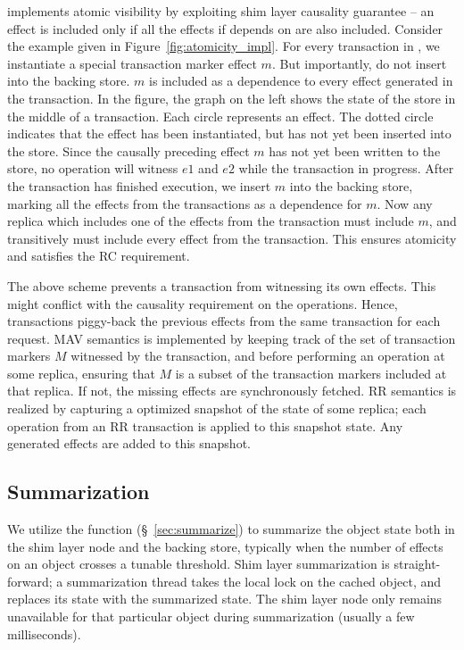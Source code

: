 \name implements atomic visibility by exploiting shim layer causality guarantee
-- an effect is included only if all the effects if depends on are also
included. Consider the example given in Figure~\ref{fig:atomicity_impl}. For
every transaction in \name, we instantiate a special transaction marker
effect $m$. But importantly, do not insert into the backing store. $m$ is
included as a dependence to every effect generated in the transaction. In the
figure, the graph on the left shows the state of the store in the middle of a
transaction. Each circle represents an effect. The dotted circle indicates that
the effect has been instantiated, but has not yet been inserted into the store.
Since the causally preceding effect $m$ has not yet been written to the store,
no operation will witness $e1$ and $e2$ while the transaction in progress.
After the transaction has finished execution, we insert $m$ into the backing
store, marking all the effects from the transactions as a dependence for $m$.
Now any replica which includes one of the effects from the transaction must
include $m$, and transitively must include every effect from the transaction.
This ensures atomicity and satisfies the RC requirement.

The above scheme prevents a transaction from witnessing its own effects. This
might conflict with the causality requirement on the operations. Hence,
transactions piggy-back the previous effects from the same transaction for each
request. MAV semantics is implemented by keeping track of the set of
transaction markers $M$ witnessed by the transaction, and before performing an
operation at some replica, ensuring that $M$ is a subset of the transaction
markers included at that replica. If not, the missing effects are synchronously
fetched. RR semantics is realized by capturing a optimized snapshot of the
state of some replica; each operation from an RR transaction is applied to this
snapshot state. Any generated effects are added to this snapshot.

\subsection{Summarization}

We utilize the  function (\S~\ref{sec:summarize}) to summarize
the object state both in the shim layer node and the backing store, typically
when the number of effects on an object crosses a tunable threshold.
Shim layer summarization is straight-forward; a summarization thread takes the
local lock on the cached object, and replaces its state with the summarized
state. The shim layer node only remains unavailable for that particular object
during summarization (usually a few milliseconds).

